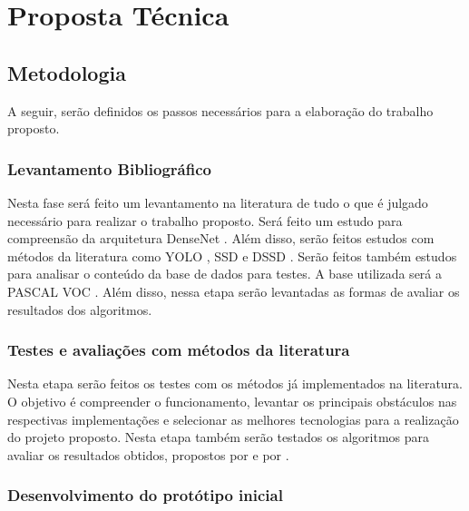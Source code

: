 \chapter{Proposta Técnica}
\label{cap:4}
\vspace{-1.9cm}


\section{Metodologia}
\label{secao:4:1}

A seguir, serão definidos os passos necessários para a elaboração do trabalho proposto.

\subsection{Levantamento Bibliográfico}
\label{subsecao:4:1:1}

Nesta fase será feito um levantamento na literatura de tudo o que é julgado necessário para realizar o trabalho proposto. Será feito um estudo para compreensão da arquitetura \ac{DenseNet} \cite{liu-2017}. Além disso, serão feitos estudos com métodos da literatura como \ac{YOLO} \cite{redmon-2015}, \ac{SSD} \cite{wei-2015} e \ac{DSSD} \cite{cheng-2017}. Serão feitos também estudos para analisar o conteúdo da base de dados para testes. A base utilizada será a \ac{PASCAL VOC} \cite{everingham-2015}. Além disso, nessa etapa serão levantadas as formas de avaliar os resultados dos algoritmos.

\subsection{Testes e avaliações com métodos da literatura}
\label{subsecao:4:1:2}

Nesta etapa serão feitos os testes com os métodos já implementados na literatura. O objetivo é compreender o funcionamento, levantar os principais obstáculos nas respectivas implementações e selecionar as melhores tecnologias para a realização do projeto proposto. Nesta etapa também serão testados os algoritmos para avaliar os resultados obtidos, propostos por  e por .

\subsection{Desenvolvimento do protótipo inicial}
\label{subsecao:4:1:3}

